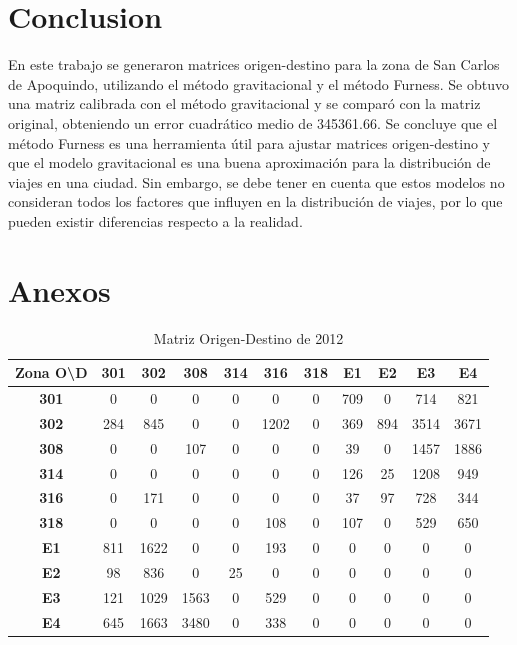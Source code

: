 \documentclass[letterpaper,12pt]{article}
\begin{document}
\section{Conclusion}

En este trabajo se generaron matrices origen-destino para la zona de San Carlos de Apoquindo, utilizando el método gravitacional y el método Furness. Se obtuvo una matriz calibrada con el método gravitacional y se comparó con la matriz original, obteniendo un error cuadrático medio de 345361.66. Se concluye que el método Furness es una herramienta útil para ajustar matrices origen-destino y que el modelo gravitacional es una buena aproximación para la distribución de viajes en una ciudad. Sin embargo, se debe tener en cuenta que estos modelos no consideran todos los factores que influyen en la distribución de viajes, por lo que pueden existir diferencias respecto a la realidad.

\newpage
\section{Anexos}
\begin{table}[h!]
    \centering
    \begin{tabular}{c|cccccccccc}    
    \textbf{Zona O\textbackslash D} & \textbf{301} & \textbf{302} & \textbf{308} & \textbf{314} & \textbf{316} & \textbf{318} & \textbf{E1} & \textbf{E2} & \textbf{E3} & \textbf{E4} \\ \hline
    \textbf{301} & 0 & 0 & 0 & 0 & 0 & 0 & 709 & 0 & 714 & 821 \\ 
    \textbf{302} & 284 & 845 & 0 & 0 & 1202 & 0 & 369 & 894 & 3514 & 3671 \\ 
    \textbf{308} & 0 & 0 & 107 & 0 & 0 & 0 & 39 & 0 & 1457 & 1886 \\ 
    \textbf{314} & 0 & 0 & 0 & 0 & 0 & 0 & 126 & 25 & 1208 & 949 \\ 
    \textbf{316} & 0 & 171 & 0 & 0 & 0 & 0 & 37 & 97 & 728 & 344 \\ 
    \textbf{318} & 0 & 0 & 0 & 0 & 108 & 0 & 107 & 0 & 529 & 650 \\ 
    \textbf{E1} & 811 & 1622 & 0 & 0 & 193 & 0 & 0 & 0 & 0 & 0 \\ 
    \textbf{E2} & 98 & 836 & 0 & 25 & 0 & 0 & 0 & 0 & 0 & 0 \\ 
    \textbf{E3} & 121 & 1029 & 1563 & 0 & 529 & 0 & 0 & 0 & 0 & 0 \\ 
    \textbf{E4} & 645 & 1663 & 3480 & 0 & 338 & 0 & 0 & 0 & 0 & 0 \\ 
    \end{tabular}
    \caption{Matriz Origen-Destino de 2012}
    \label{table:data_matrix}
\end{table}
\end{document}
